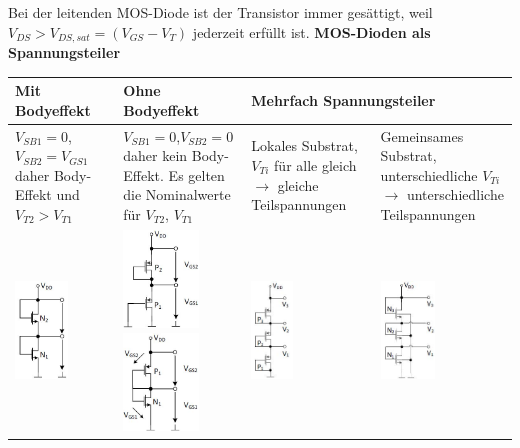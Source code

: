 Bei der leitenden MOS-Diode ist der Transistor immer gesättigt, weil $V_{DS}>V_{DS,sat} = (V_{GS}-V_T)$ jederzeit erfüllt ist.
\textbf{MOS-Dioden als Spannungsteiler}\\
\begin{tabular}{|p{}|p{}|p{}|p{}|}
	\hline
	\textbf{Mit Bodyeffekt}&\textbf{Ohne Bodyeffekt}&\multicolumn{2}{l|}{\textbf{Mehrfach Spannungsteiler}}\\ \hline
	$V_{SB1}=0$, $V_{SB2}=V_{GS1}$ daher Body-Effekt und $V_{T2} > V_{T1}$&$V_{SB1}=0$,$V_{SB2}=0$ daher kein Body-Effekt. Es gelten die Nominalwerte für $V_{T2}$, $V_{T1}$&Lokales Substrat, $V_{Ti}$ für alle gleich $\rightarrow$ gleiche Teilspannungen&Gemeinsames Substrat, unterschiedliche $V_{Ti}$ $\rightarrow$ unterschiedliche Teilspannungen\\
	\includegraphics[height=2.6cm]{chapters/Diode/images/SpgT_N_Bodyeffekt}&
	\includegraphics[height=2.6cm]{chapters/Diode/images/SpgT_P_body}
	\includegraphics[height=2.6cm]{chapters/Diode/images/SpgT_PN}&
	\includegraphics[height=2.6cm]{chapters/Diode/images/SpgT_P3}&
	\includegraphics[height=2.6cm]{chapters/Diode/images/SpgT_N3}\\    
	\hline	
\end{tabular}